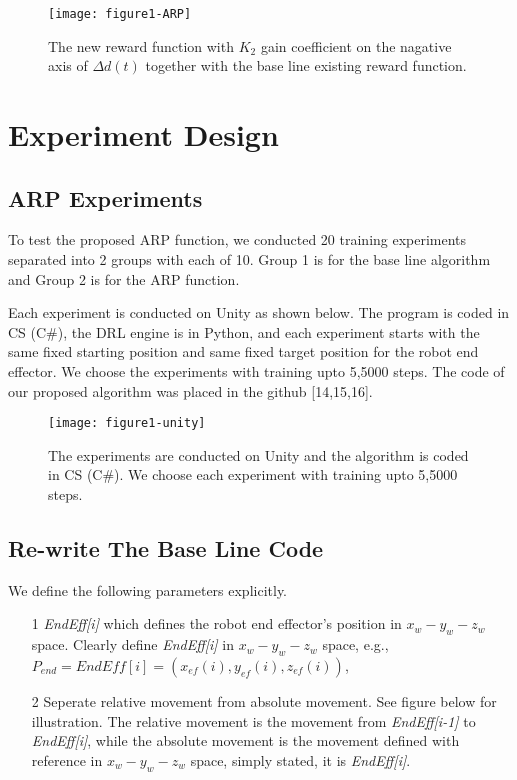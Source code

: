 \documentclass[conference]{IEEEtran}
\begin{document}
\begin{figure}[H] 
\centering
\texttt{[image: figure1-ARP]} 
\caption{The new reward function
with $K_2$ gain coefficient on the nagative 
axis of $\Delta d(t)$ together with the base line 
existing reward function.}
\label{figure1-ARP} 
\end{figure} 

\section{Experiment Design}
\subsection{ARP Experiments}
To test the proposed ARP function, we conducted 
20 training experiments separated into 2 groups
with each of 10. Group 1 is for the base line algorithm 
and Group 2 is for the ARP function. 

Each experiment is conducted on Unity as shown below. 
The program is coded in CS (C\#), the DRL engine is 
in Python, and each experiment
starts with the same fixed starting 
position and same fixed target position for the 
robot end effector. We choose the experiments
with training upto 5,5000 steps. 
The code of our proposed algorithm was placed in the 
github [14,15,16]. 

\begin{figure}[H] 
\centering
\texttt{[image: figure1-unity]} 
\caption{The experiments are conducted on Unity  
and the algorithm is coded in CS (C\#).
We choose each experiment
with training upto 5,5000 steps.}
\label{figure1-unity} 
\end{figure} 
 
 
\subsection{Re-write The Base Line Code}
We define the following parameters explicitly. 

\begin{itemize}
\item[1] {\it EndEff[i]} which defines the robot end effector's 
position in $x_w-y_w-z_w$ space. Clearly define {\it EndEff[i]} 
in $x_w-y_w-z_w$ space, 
e.g., $P_{end} = EndEff[i] = (x_{ef}(i),y_{ef}(i),z_{ef}(i))$, 

\item[2] Seperate relative movement from absolute 
movement. See figure below for illustration. The relative
movement is the movement from {\it EndEff[i-1]} to 
{\it EndEff[i]}, while the absolute movement is the movement 
defined with reference in $x_w-y_w-z_w$ space, simply stated, 
it is {\it EndEff[i]}. 
\end{itemize}  
\end{document}

